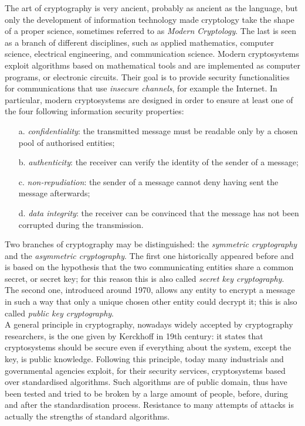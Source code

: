 The art of cryptography is very ancient, probably as ancient as the language, but only the development of information technology made cryptology take the shape of a proper science, sometimes referred to as \emph{Modern Cryptology}. The last is seen as a branch of different disciplines, such as applied mathematics, computer science, electrical engineering, and communication science. Modern cryptosystems exploit algorithms based on mathematical tools and are implemented as computer programs, or electronic circuits. Their goal is to provide security functionalities for communications that use \emph{insecure channels}, for example the Internet. In particular, modern cryptosystems are designed in order to ensure at least one of the four following information security properties:
\begin{itemize}
\item[a.] \emph{confidentiality}: the transmitted message must be readable only by a chosen pool of authorised entities;
\item[b.] \emph{authenticity}: the receiver can verify the identity of the sender of a message;
\item[c.] \emph{non-repudiation}: the sender of a message cannot deny having sent the message afterwards;
\item[d.] \emph{data integrity}: the receiver can be convinced that the message has not been corrupted during the transmission.


\end{itemize} 

Two branches of cryptography may be distinguished: the \emph{symmetric cryptography} and the \emph{asymmetric cryptography}. The first one historically appeared before and is based on the hypothesis that the two communicating entities share a common secret, or secret key; for this reason this is also called \emph{secret key cryptography}. The second one, introduced around 1970, allows any entity to encrypt a message in such a way that only a unique chosen other entity could decrypt it; this is also called \emph{public key cryptography}. \\

A general principle in cryptography, nowadays widely accepted by cryptography researchers, is the one given by Kerckhoff in 19th century: it states that cryptosystems should be secure even if everything about the system, except the key, is public knowledge. Following this principle, today many industrials and governmental agencies exploit, for their security services, cryptosystems based over standardised algorithms. Such algorithms are of public domain, thus have been tested and tried to be broken by a large amount of people, before, during and after the standardisation process. Resistance to many attempts of attacks is actually the strengths of standard algorithms. \\


